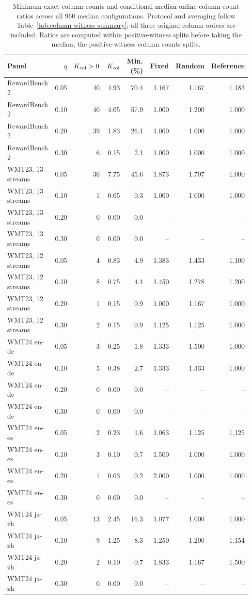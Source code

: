 \begin{table}[t]
\centering\small


\begin{tabular}{lrrrrrrr}
\toprule
Panel & $q$ & $K_{\rm col}>0$ & $K_{\rm col}$ & Min. (\%) & Fixed & Random & Reference \\
\midrule
RewardBench 2 & 0.05 & 40 & 4.93 & 70.4 & 1.167 & 1.167 & 1.183 \\
RewardBench 2 & 0.10 & 40 & 4.05 & 57.9 & 1.000 & 1.200 & 1.000 \\
RewardBench 2 & 0.20 & 39 & 1.83 & 26.1 & 1.000 & 1.000 & 1.000 \\
RewardBench 2 & 0.30 & 6 & 0.15 & 2.1 & 1.000 & 1.000 & 1.000 \\
WMT23, 13 streams & 0.05 & 36 & 7.75 & 45.6 & 1.873 & 1.707 & 1.000 \\
WMT23, 13 streams & 0.10 & 1 & 0.05 & 0.3 & 1.000 & 1.000 & 1.000 \\
WMT23, 13 streams & 0.20 & 0 & 0.00 & 0.0 & -- & -- & -- \\
WMT23, 13 streams & 0.30 & 0 & 0.00 & 0.0 & -- & -- & -- \\
WMT23, 12 streams & 0.05 & 4 & 0.83 & 4.9 & 1.383 & 1.433 & 1.100 \\
WMT23, 12 streams & 0.10 & 8 & 0.75 & 4.4 & 1.450 & 1.278 & 1.200 \\
WMT23, 12 streams & 0.20 & 1 & 0.15 & 0.9 & 1.000 & 1.167 & 1.000 \\
WMT23, 12 streams & 0.30 & 2 & 0.15 & 0.9 & 1.125 & 1.125 & 1.000 \\
WMT24 en-de & 0.05 & 3 & 0.25 & 1.8 & 1.333 & 1.500 & 1.000 \\
WMT24 en-de & 0.10 & 5 & 0.38 & 2.7 & 1.333 & 1.333 & 1.000 \\
WMT24 en-de & 0.20 & 0 & 0.00 & 0.0 & -- & -- & -- \\
WMT24 en-de & 0.30 & 0 & 0.00 & 0.0 & -- & -- & -- \\
WMT24 en-es & 0.05 & 2 & 0.23 & 1.6 & 1.063 & 1.125 & 1.125 \\
WMT24 en-es & 0.10 & 3 & 0.10 & 0.7 & 1.500 & 1.000 & 1.000 \\
WMT24 en-es & 0.20 & 1 & 0.03 & 0.2 & 2.000 & 1.000 & 1.000 \\
WMT24 en-es & 0.30 & 0 & 0.00 & 0.0 & -- & -- & -- \\
WMT24 ja-zh & 0.05 & 13 & 2.45 & 16.3 & 1.077 & 1.000 & 1.000 \\
WMT24 ja-zh & 0.10 & 9 & 1.25 & 8.3 & 1.250 & 1.200 & 1.154 \\
WMT24 ja-zh & 0.20 & 2 & 0.10 & 0.7 & 1.833 & 1.167 & 1.500 \\
WMT24 ja-zh & 0.30 & 0 & 0.00 & 0.0 & -- & -- & -- \\
\bottomrule
\end{tabular}
\caption{Minimum exact column counts and conditional median online column-count ratios across all 960 median configurations. Protocol and averaging follow Table~\ref{tab:column-witness-summary}; all three original column orders are included. Ratios are computed within positive-witness splits before taking the median; the positive-witness column counts splits.}
\label{tab:column-witness-all}
\end{table}

